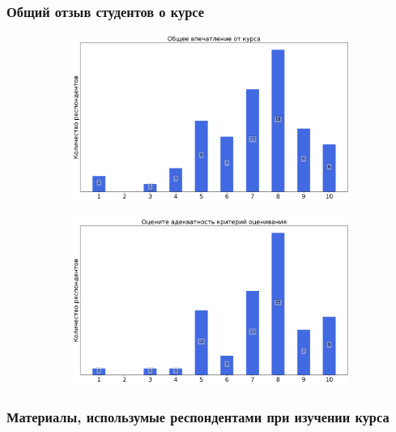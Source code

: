 	\subsubsection{Общий отзыв студентов о курсе}

		\begin{figure}[H]
			\centering
			\begin{subfigure}[b]{0.45\textwidth}
				\centering
				\includegraphics[width=\textwidth]{images/3 course/Теория поля/general-0.png}
			\end{subfigure}
			\begin{subfigure}[b]{0.45\textwidth}
				\centering
				\includegraphics[width=\textwidth]{images/3 course/Теория поля/general-1.png}
			\end{subfigure}	
		\end{figure}

	\subsubsection{Материалы, использумые респондентами при изучении курса}

